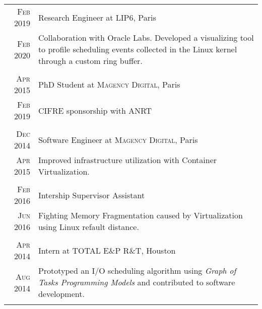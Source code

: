 \documentclass[a4paper,10pt]{article} %
\begin{document}
\begin{tabular}{r|p{11cm}}


\textsc{Feb 2019} & Research Engineer at \textsc{LIP6}, Paris\\
\textsc{Feb 2020}  & \footnotesize{
Collaboration with Oracle Labs.
Developed a visualizing tool to profile scheduling events collected in the Linux kernel through a custom ring buffer.
}\\
\multicolumn{2}{c}{} \\

\textsc{Apr 2015} & PhD Student at \textsc{Magency Digital}, Paris\\
\textsc{Feb 2019}  & \footnotesize{CIFRE sponsorship with ANRT}\\
\multicolumn{2}{c}{} \\

\textsc{Dec 2014} & Software Engineer at \textsc{Magency Digital}, Paris\\
\textsc{Apr 2015} & \footnotesize{Improved infrastructure utilization with Container Virtualization.}\\
\multicolumn{2}{c}{} \\


\textsc{Feb 2016} & Intership Supervisor Assistant\\
\textsc{Jun 2016} & \footnotesize{Fighting Memory Fragmentation caused by Virtualization using Linux refault distance.}\\
\multicolumn{2}{c}{} \\


\textsc{Apr 2014} & Intern at \textsc{TOTAL E\&P R\&T}, Houston\\
\textsc{Aug 2014} & \footnotesize{Prototyped an I/O scheduling algorithm using \emph{Graph of Tasks Programming Models} and contributed to software development.}\\
\multicolumn{2}{c}{} \\



\end{tabular}
\end{document}
